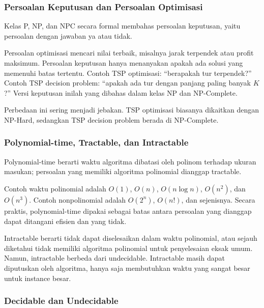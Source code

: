 \subsubsection{Persoalan Keputusan dan Persoalan Optimisasi}

\begin{jawab}
Kelas P, NP, dan NPC secara formal membahas persoalan keputusan, yaitu persoalan dengan jawaban ya atau tidak.
\end{jawab}

Persoalan optimisasi mencari nilai terbaik, misalnya jarak terpendek atau profit maksimum. Persoalan keputusan hanya menanyakan apakah ada solusi yang memenuhi batas tertentu. Contoh TSP optimisasi: ``berapakah tur terpendek?'' Contoh TSP decision problem: ``apakah ada tur dengan panjang paling banyak $K$?'' Versi keputusan inilah yang dibahas dalam kelas NP dan NP-Complete.

Perbedaan ini sering menjadi jebakan. TSP optimisasi biasanya dikaitkan dengan NP-Hard, sedangkan TSP decision problem berada di NP-Complete.

\subsubsection{Polynomial-time, Tractable, dan Intractable}

\begin{jawab}
Polynomial-time berarti waktu algoritma dibatasi oleh polinom terhadap ukuran masukan; persoalan yang memiliki algoritma polinomial dianggap tractable.
\end{jawab}

Contoh waktu polinomial adalah $O(1)$, $O(n)$, $O(n\log n)$, $O(n^2)$, dan $O(n^3)$. Contoh nonpolinomial adalah $O(2^n)$, $O(n!)$, dan sejenisnya. Secara praktis, polynomial-time dipakai sebagai batas antara persoalan yang dianggap dapat ditangani efisien dan yang tidak.

Intractable berarti tidak dapat diselesaikan dalam waktu polinomial, atau sejauh diketahui tidak memiliki algoritma polinomial untuk penyelesaian eksak umum. Namun, intractable berbeda dari undecidable. Intractable masih dapat diputuskan oleh algoritma, hanya saja membutuhkan waktu yang sangat besar untuk instance besar.

\subsubsection{Decidable dan Undecidable}

